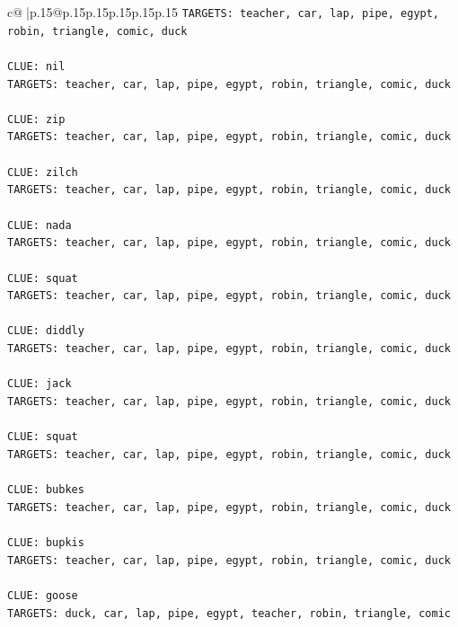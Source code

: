 \documentclass{article}
\begin{document}
{\begin{supertabular}{c@{$\;$}|p{.15\linewidth}@{}p{.15\linewidth}p{.15\linewidth}p{.15\linewidth}p{.15\linewidth}p{.15\linewidth}}
{{{\texttt{TARGETS: teacher, car, lap, pipe, egypt, robin, triangle, comic, duck} \\
\\ 
\texttt{CLUE: nil} \\
\texttt{TARGETS: teacher, car, lap, pipe, egypt, robin, triangle, comic, duck} \\
\\ 
\texttt{CLUE: zip} \\
\texttt{TARGETS: teacher, car, lap, pipe, egypt, robin, triangle, comic, duck} \\
\\ 
\texttt{CLUE: zilch} \\
\texttt{TARGETS: teacher, car, lap, pipe, egypt, robin, triangle, comic, duck} \\
\\ 
\texttt{CLUE: nada} \\
\texttt{TARGETS: teacher, car, lap, pipe, egypt, robin, triangle, comic, duck} \\
\\ 
\texttt{CLUE: squat} \\
\texttt{TARGETS: teacher, car, lap, pipe, egypt, robin, triangle, comic, duck} \\
\\ 
\texttt{CLUE: diddly} \\
\texttt{TARGETS: teacher, car, lap, pipe, egypt, robin, triangle, comic, duck} \\
\\ 
\texttt{CLUE: jack} \\
\texttt{TARGETS: teacher, car, lap, pipe, egypt, robin, triangle, comic, duck} \\
\\ 
\texttt{CLUE: squat} \\
\texttt{TARGETS: teacher, car, lap, pipe, egypt, robin, triangle, comic, duck} \\
\\ 
\texttt{CLUE: bubkes} \\
\texttt{TARGETS: teacher, car, lap, pipe, egypt, robin, triangle, comic, duck} \\
\\ 
\texttt{CLUE: bupkis} \\
\texttt{TARGETS: teacher, car, lap, pipe, egypt, robin, triangle, comic, duck} \\
\\ 
\texttt{CLUE: goose} \\
\texttt{TARGETS: duck, car, lap, pipe, egypt, teacher, robin, triangle, comic} \\
}}}
\end{supertabular}}
\end{document}
